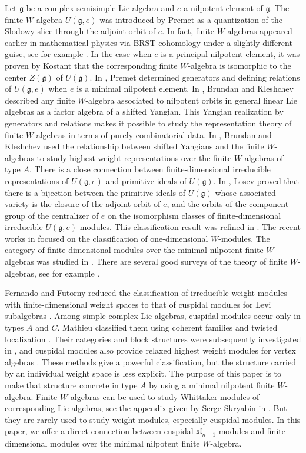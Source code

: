 \documentclass[12pt,a4paper]{amsart}
\numberwithin{equation}{section}
\def\mg{\mathfrak{g}}
\def\sl{\mathfrak{sl}}
\begin{document}
Let $\mg$ be a complex semisimple Lie algebra and $e$ a nilpotent element of $\mg$.   The finite $W$-algebra $U(\mg,e)$ was introduced  by Premet \cite{Pr1}  as a quantization of the Slodowy slice through the adjoint orbit of $e$.
In fact, finite $W$-algebras appeared earlier in mathematical physics via BRST cohomology
under a slightly different guise, see for example \cite{BT,DV,Tj}.
 In the case when  $e$ is a principal nilpotent element, it was proven by Kostant \cite{K} that the corresponding finite $W$-algebra  is isomorphic to the center $Z(\mg)$ of $U(\mg)$. In \cite{Pr2}, Premet  determined generators and defining  relations of $U(\mg, e)$ when $e$ is a minimal nilpotent element. In \cite{BK}, Brundan and Kleshchev described any finite $W$-algebra associated to nilpotent orbits in general linear Lie algebras as a factor algebra of a shifted Yangian. This Yangian realization  by generators and relations makes it possible to study the representation theory of finite $W$-algebras in terms of purely combinatorial data. In \cite{BK2}, Brundan and Kleshchev used the relationship between shifted Yangians and the finite $W$-algebras  to study  highest weight representations over the finite $W$-algebras of type $A$.  There is a close connection between finite-dimensional irreducible representations of
$U(\mg, e)$ and primitive ideals of $U(\mg)$. In \cite{L},  Losev proved
that there is a bijection between the primitive ideals of $U(\mg)$ whose associated variety is the
closure of the adjoint orbit of $e$, and the orbits of the component group of the centralizer of $e$ on
the isomorphism classes of finite-dimensional irreducible $U(\mg, e)$-modules.
 This classification result  was refined in  \cite{LO}.
The recent works in \cite{PT,T} focused on the classification of one-dimensional $W$-modules. The category of finite-dimensional modules over the minimal
nilpotent finite $W$-algebras was studied in \cite{Pe}. There are several good surveys of the theory of finite $W$-algebras, see for example \cite{L2,W}.


Fernando and Futorny reduced the classification of irreducible weight modules
with finite-dimensional weight spaces to that of cuspidal modules for Levi
subalgebras \cite{F,Fu}. Among simple complex Lie algebras, cuspidal modules
occur only in types $A$ and $C$. Mathieu classified them using coherent
families and twisted localization \cite{M}. Their categories and block
structures were subsequently investigated in \cite{BKLM,GS1,GS2,GS3,MS2},
and cuspidal modules also provide relaxed highest weight modules for vertex
algebras \cite{ACD,FKR,KR,KR2}. These methods give a powerful classification,
but the structure carried by an individual weight space is less explicit.
The purpose of this paper is to make that structure concrete in type $A$ by
using a minimal nilpotent finite $W$-algebra. Finite $W$-algebras can be used to study Whittaker modules of corresponding Lie algebras, see the appendix given by Serge Skryabin in \cite{Pr1}. But they are rarely used to study weight modules, especially cuspidal modules. In this paper, we offer a direct connection between cuspidal $\sl_{n+1}$-modules and finite-dimensional modules over the minimal nilpotent finite $W$-algebra.
\end{document}

